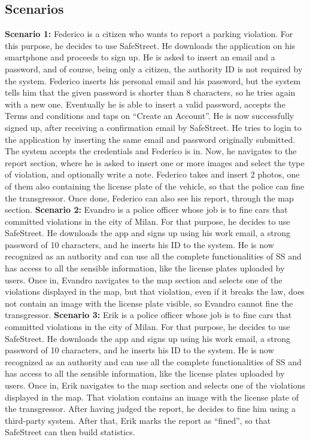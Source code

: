 \documentclass[../RASD.tex]{subfiles}
\begin{document}
            \subsection{Scenarios}\label{subsec:scenarios}
                \textbf{Scenario 1:} Federico is a citizen who wants to report a parking violation. For this purpose, he decides to use SafeStreet. He downloads the application on his smartphone and proceeds to sign up. He is asked to insert an email and a password, and of course, being only a citizen, the authority ID is not required by the system. Federico inserts his personal email and his password, but the system tells him that the given password is shorter than 8 characters, so he tries again with a new one. Eventually he is able to insert a valid password, accepts the Terms and conditions and taps on “Create an Account”. He is now successfully signed up, after receiving a confirmation email by SafeStreet. He tries to login to the application by inserting the same email and password originally submitted. The system accepts the credentials and Federico is in. Now, he navigates to the report section, where he is asked to insert one or more images and select the type of violation, and optionally write a note. Federico takes and insert 2 photos, one of them also containing the license plate of the vehicle, so that the police can fine the transgressor. Once done, Federico can also see his report, through the map section.
    \newline
    \newline
                \textbf{Scenario 2:} Evandro is a police officer whose job is to fine cars that committed violations in the city of Milan. For that purpose, he decides to use SafeStreet. He downloads the app and signs up using his work email, a strong password of 10 characters, and he inserts his ID to the system. He is now recognized as an authority and can use all the complete functionalities of SS and has access to all the sensible information, like the license plates uploaded by users. Once in, Evandro navigates to the map section and selects one of the violations displayed in the map, but that violation, even if it breaks the law, does not contain an image with the license plate visible, so Evandro cannot fine the transgressor.
    \newline
    \newline
                \textbf{Scenario 3:} Erik is a police officer whose job is to fine cars that committed violations in the city of Milan. For that purpose, he decides to use SafeStreet. He downloads the app and signs up using his work email, a strong password of 10 characters, and he inserts his ID to the system. He is now recognized as an authority and can use all the complete functionalities of SS and has access to all the sensible information, like the license plates uploaded by users. Once in, Erik navigates to the map section and selects one of the violations displayed in the map. That violation contains an image with the license plate of the transgressor. After having judged the report, he decides to fine him using a third-party system. After that, Erik marks the report as “fined”, so that SafeStreet can then build statistics.
\end{document}
